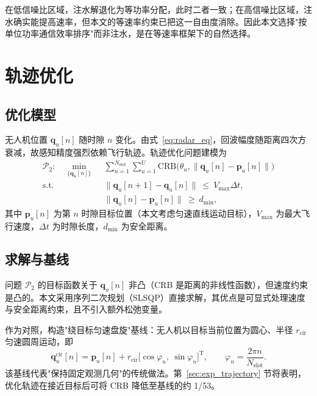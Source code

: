 在低信噪比区域，注水解退化为等功率分配，此时二者一致；在高信噪比区域，注水确实能提高速率，但本文的等速率约束已把这一自由度消除。因此本文选择"按单位功率通信效率排序"而非注水，是在等速率框架下的自然选择。

\section{轨迹优化}
\label{sec:trajectory}

\subsection{优化模型}
\label{sec:traj_model}

无人机位置 $\mathbf{q}_u[n]$ 随时隙 $n$ 变化。由式~\eqref{eq:radar_eq}，回波幅度随距离四次方衰减，故感知精度强烈依赖飞行轨迹。轨迹优化问题建模为
\begin{equation}
  \begin{aligned}
    \mathcal{P}_{2}:\quad \min_{\{\mathbf{q}_u[n]\}}\ \ &
    \sum_{n=1}^{N_{\mathrm{slot}}}\sum_{u=1}^{U}\mathrm{CRB}\bigl(\theta_u,\lVert\mathbf{q}_u[n]-\mathbf{p}_u[n]\rVert\bigr)\\
    \text{s.t.}\quad & \lVert\mathbf{q}_u[n+1]-\mathbf{q}_u[n]\rVert\ \le\ V_{\max}\Delta t,\\
    & \lVert\mathbf{q}_u[n]-\mathbf{p}_u[n]\rVert\ \ge\ d_{\min},
  \end{aligned}
  \label{eq:p2}
\end{equation}
其中 $\mathbf{p}_u[n]$ 为第 $n$ 时隙目标位置（本文考虑匀速直线运动目标），$V_{\max}$ 为最大飞行速度，$\Delta t$ 为时隙长度，$d_{\min}$ 为安全距离。

\subsection{求解与基线}
\label{sec:traj_solve}

问题 $\mathcal{P}_{2}$ 的目标函数关于 $\mathbf{q}_u[n]$ 非凸（CRB 是距离的非线性函数），但速度约束是凸的。本文采用序列二次规划（SLSQP）直接求解，其优点是可显式处理速度与安全距离约束，且不引入额外松弛变量。

作为对照，构造"绕目标匀速盘旋"基线：无人机以目标当前位置为圆心、半径 $r_{\mathrm{cir}}$ 匀速圆周运动，即
\begin{equation}
  \mathbf{q}_u^{\mathrm{cir}}[n]=\mathbf{p}_u[n]+r_{\mathrm{cir}}\bigl[\cos\varphi_n,\ \sin\varphi_n\bigr]^{\mathrm{T}},
  \qquad
  \varphi_n=\frac{2\pi n}{N_{\mathrm{slot}}}.
  \label{eq:cir}
\end{equation}
该基线代表"保持固定观测几何"的传统做法。第~\ref{sec:exp_trajectory} 节将表明，优化轨迹在接近目标后可将 CRB 降低至基线的约 1/53。

